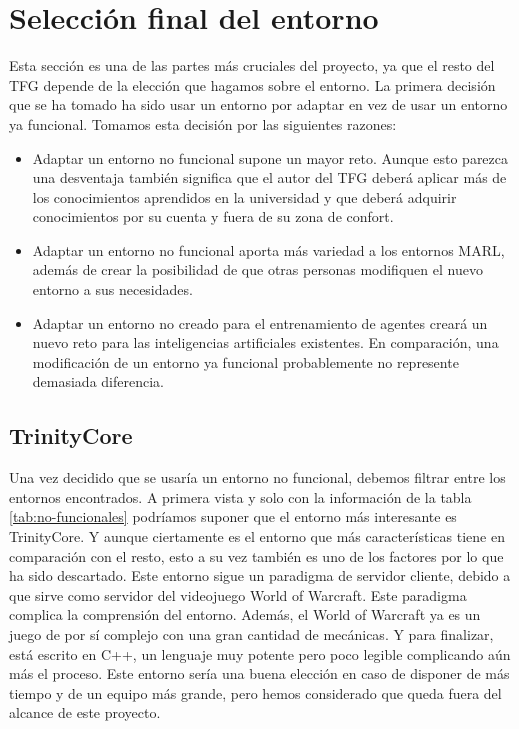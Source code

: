 \section{Selección final del entorno}
Esta sección es una de las partes más cruciales del proyecto, ya que el resto del TFG depende de la elección que hagamos sobre el entorno. La primera decisión que se ha tomado ha sido usar un entorno por adaptar en vez de usar un entorno ya funcional. Tomamos esta decisión por las siguientes razones:

\begin{itemize}
    \item Adaptar un entorno no funcional supone un mayor reto. Aunque esto parezca una desventaja también significa que el autor del TFG deberá aplicar más de los conocimientos aprendidos en la universidad y que deberá adquirir conocimientos por su cuenta y fuera de su zona de confort.
    \item Adaptar un entorno no funcional aporta más variedad a los entornos MARL, además de crear la posibilidad de que otras personas modifiquen el nuevo entorno a sus necesidades.
    \item Adaptar un entorno no creado para el entrenamiento de agentes creará un nuevo reto para las inteligencias artificiales existentes. En comparación, una modificación de un entorno ya funcional probablemente no represente demasiada diferencia.
\end{itemize}

\subsection{TrinityCore}

Una vez decidido que se usaría un entorno no funcional, debemos filtrar entre los entornos encontrados. A primera vista y solo con la información de la tabla \ref {tab:no-funcionales} podríamos suponer que el entorno más interesante es TrinityCore. Y aunque ciertamente es el entorno que más características tiene en comparación con el resto, esto a su vez también es uno de los factores por lo que ha sido descartado. Este entorno sigue un paradigma de servidor cliente, debido a que sirve como servidor del videojuego World of Warcraft. Este paradigma complica la comprensión del entorno. Además, el World of Warcraft ya es un juego de por sí complejo con una gran cantidad de mecánicas. Y para finalizar, está escrito en C++, un lenguaje muy potente pero poco legible complicando aún más el proceso. Este entorno sería una buena elección en caso de disponer de más tiempo y de un equipo más grande, pero  hemos considerado que queda fuera del alcance de este proyecto.

